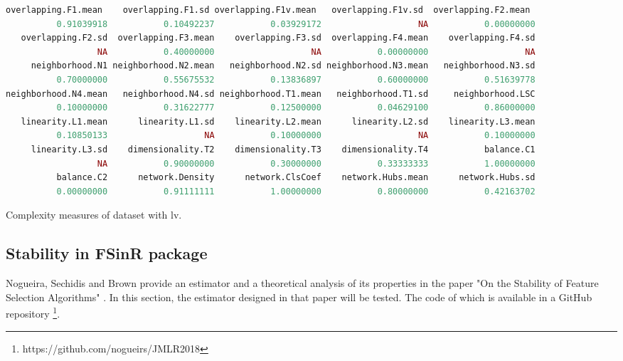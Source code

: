\begin{itemize}
\begin{codefloat}[H]
\begin{lstlisting}[language=R, style=console]
 overlapping.F1.mean    overlapping.F1.sd overlapping.F1v.mean   overlapping.F1v.sd  overlapping.F2.mean 
          0.91039918           0.10492237           0.03929172                   NA           0.00000000 
   overlapping.F2.sd  overlapping.F3.mean    overlapping.F3.sd  overlapping.F4.mean    overlapping.F4.sd 
                  NA           0.40000000                   NA           0.00000000                   NA 
     neighborhood.N1 neighborhood.N2.mean   neighborhood.N2.sd neighborhood.N3.mean   neighborhood.N3.sd 
          0.70000000           0.55675532           0.13836897           0.60000000           0.51639778 
neighborhood.N4.mean   neighborhood.N4.sd neighborhood.T1.mean   neighborhood.T1.sd     neighborhood.LSC 
          0.10000000           0.31622777           0.12500000           0.04629100           0.86000000 
   linearity.L1.mean      linearity.L1.sd    linearity.L2.mean      linearity.L2.sd    linearity.L3.mean 
          0.10850133                   NA           0.10000000                   NA           0.10000000 
     linearity.L3.sd    dimensionality.T2    dimensionality.T3    dimensionality.T4           balance.C1 
                  NA           0.90000000           0.30000000           0.33333333           1.00000000 
          balance.C2      network.Density      network.ClsCoef    network.Hubs.mean      network.Hubs.sd 
          0.00000000           0.91111111           1.00000000           0.80000000           0.42163702 
\end{lstlisting}
\caption{Complexity measures of dataset with \acrshort{lv}.}
\label{cod:complexity-lv}
\end{codefloat}

\end{itemize}

\subsection{Stability in FSinR package}
\label{sec:stability-fsinr}

Nogueira, Sechidis and Brown provide an estimator and a theoretical analysis of its properties in the paper "On the Stability of Feature Selection Algorithms" \cite{JMLR2018}. In this section, the estimator designed in that paper will be tested. The code of which is available in a GitHub repository \footnote{https://github.com/nogueirs/JMLR2018}.

